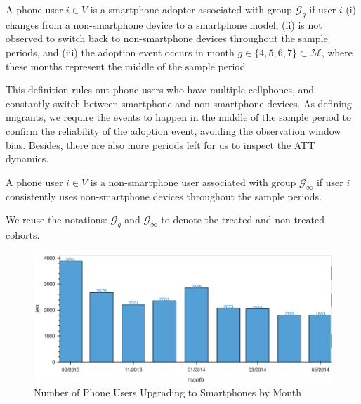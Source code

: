 \begin{definition}\label{def:smartphone_adopter}
A phone user $i \in V$ is a smartphone adopter associated with group $\mathcal{G}_g$ if user $i$ (i) changes from a non-smartphone device to a smartphone model, (ii) is not observed to switch back to non-smartphone devices throughout the sample periods, and (iii) the adoption event occurs in month $g \in \{4,5,6,7\} \subset \mathcal{M}$, where these months represent the middle of the sample period.
\end{definition}

This definition rules out phone users who have multiple cellphones, and constantly switch between smartphone and non-smartphone devices.
As defining migrants, we require the events to happen in the middle of the sample period to confirm the reliability of the adoption event, avoiding the observation window bias.
Besides, there are also more periods left for us to inspect the ATT dynamics.

\begin{definition}
A phone user $i \in V$ is a non-smartphone user associated with group $\mathcal{G}_{\infty}$ if user $i$ consistently uses non-smartphone devices throughout the sample periods.
\end{definition}

We reuse the notations: \( \mathcal{G}_g \) and \( \mathcal{G}_{\infty} \) to denote the treated and non-treated cohorts.

\begin{figure}[h!]
\centering
\caption{Number of Phone Users Upgrading to Smartphones by Month}
\vspace{0.1cm}

\includegraphics[scale=0.51]{figures/number_of_smartphone_adopters.png}


\label{fig:number_of_smartphone_changers}
\end{figure}

